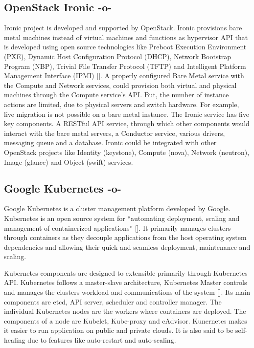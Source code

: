 \subsection{OpenStack Ironic -o-}

Ironic project is developed and supported by OpenStack. Ironic
provisions bare metal machines instead of virtual machines and
functions as hypervisor API that is developed using open source
technologies like Preboot Execution Environment (PXE), Dynamic Host
Configuration Protocol (DHCP), Network Bootstrap Program (NBP),
Trivial File Transfer Protocol (TFTP) and Intelligent Platform
Management Interface (IPMI) [\cite{www-ironicwebsite}]. A properly
configured Bare Metal service with the Compute and Network services,
could provision both virtual and physical machines through the Compute
service's API. But, the number of instance actions are limited, due to
physical servers and switch hardware. For example, live migration is
not possible on a bare metal instance. The Ironic service has five key
components. A RESTful API service, through which other components
would interact with the bare metal servers, a Conductor service,
various drivers, messaging queue and a database. Ironic could be
integrated with other OpenStack projects like Identity (keystone),
Compute (nova), Network (neutron), Image (glance) and Object (swift)
services.


     
\subsection{Google Kubernetes -o-}

Google Kubernetes is a cluster management platform developed by
Google. Kubernetes is an open source system for ``automating
deployment, scaling and management of containerized
applications'' [\cite{www-kubernetesdoc}]. It primarily manages clusters
through containers as they decouple applications from the host
operating system dependencies and allowing their quick and seamless
deployment, maintenance and scaling.

Kubernetes components are designed to extensible primarily through
Kubernetes API. Kubernetes follows a master-slave architecture,
Kubernetes Master controls and manages the clusters workload and
communications of the system [\cite{www-kuberneteswiki}].  Its main
components are etcd, API server, scheduler and controller manager. The
individual Kubernetes nodes are the workers where containers are
deployed. The components of a node are Kubelet, Kube-proxy and
cAdvisor. Kunernetes makes it easier to run application on public and
private clouds. It is also said to be self-healing due to features
like auto-restart and auto-scaling.


